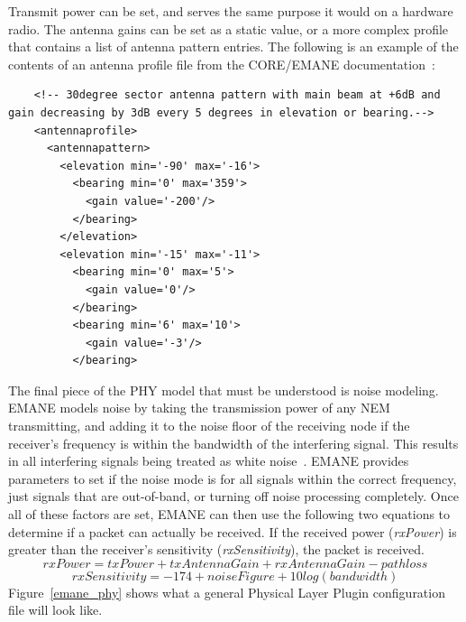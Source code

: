 Transmit power can be set, and serves the same purpose it would on a hardware radio.
The antenna gains can be set as a static value, or a more complex profile that contains a list of antenna pattern entries.
The following is an example of the contents of an antenna profile file from the CORE/EMANE documentation~\cite{core}:
\begin{center}
\begin{minipage}{\textwidth}
    \begin{verbatim}
    <!-- 30degree sector antenna pattern with main beam at +6dB and gain decreasing by 3dB every 5 degrees in elevation or bearing.-->
    <antennaprofile>
      <antennapattern>
        <elevation min='-90' max='-16'>
          <bearing min='0' max='359'>
            <gain value='-200'/>
          </bearing>
        </elevation>
        <elevation min='-15' max='-11'>
          <bearing min='0' max='5'>
            <gain value='0'/>
          </bearing>
          <bearing min='6' max='10'>
            <gain value='-3'/>
          </bearing>
    \end{verbatim}
\end{minipage}
\end{center} \par
The final piece of the PHY model that must be understood is noise modeling.
EMANE models noise by taking the transmission power of any NEM transmitting, and adding it to the noise floor of the receiving node if the receiver's frequency is within the bandwidth of the interfering signal.
This results in all interfering signals being treated as white noise~\cite{emane_phy}.
EMANE provides parameters to set if the noise mode is for all signals within the correct frequency, just signals that are out-of-band, or turning off noise processing completely.
Once all of these factors are set, EMANE can then use the following two equations to determine if a packet can actually be received.
If the received power (\textit{rxPower}) is greater than the receiver's sensitivity (\textit{rxSensitivity}), the packet is received.
\[ rxPower = txPower + txAntennaGain + rxAntennaGain - pathloss \]
\[ rxSensitivity = -174 + noiseFigure + 10log(bandwidth) \]
Figure~\ref{emane_phy} shows what a general Physical Layer Plugin configuration file will look like. \par

